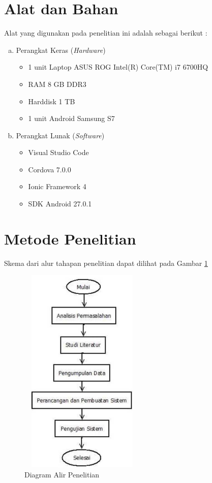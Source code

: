 \section{Alat dan Bahan}
Alat yang digunakan pada penelitian ini adalah sebagai berikut :

\begin{enumerate}[a.]
\item Perangkat Keras (\textit{Hardware})
	\begin{itemize}
		\item 1 unit Laptop ASUS ROG Intel(R) Core(TM) i7 6700HQ
		\item RAM 8 GB DDR3
		\item Harddisk 1 TB
		\item 1 unit Android Samsung S7
	\end{itemize}

\item Perangkat Lunak (\textit{Software})
	\begin{itemize}
		\item Visual Studio Code
		\item Cordova 7.0.0
		\item Ionic Framework 4
		\item SDK Android 27.0.1
	\end{itemize}
\end{enumerate}

\section{Metode Penelitian}
Skema dari alur tahapan penelitian dapat dilihat pada Gambar \ref{alur}
\vspace{-0.4cm}
\begin{figure}[H]
	\center
	\includegraphics [width = 6cm, height= 10cm]{gambar/alur2}
	\caption{Diagram Alir Penelitian}
	\label{alur}
\end{figure}

